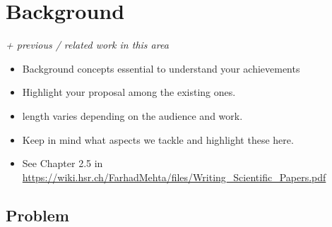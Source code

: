 \chapter{Background}
\label{sec:background}

\textit{+ previous / related work in this area}
\begin{itemize}
    \item Background concepts essential to understand your achievements
    \item Highlight your proposal among the existing ones.
    \item length varies depending on the audience and work.
    \item Keep in mind what aspects we tackle and highlight these here.
    \item See Chapter 2.5 in \url{https://wiki.hsr.ch/FarhadMehta/files/Writing_Scientific_Papers.pdf}
\end{itemize}

\section{Problem}\label{sec:problem}



